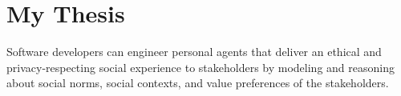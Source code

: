 \chapter{My Thesis}
\label{chap:thesis}

Software developers can engineer personal agents that deliver an ethical and privacy-respecting social experience to stakeholders by modeling and reasoning about social norms, social contexts, and value preferences of the stakeholders. 